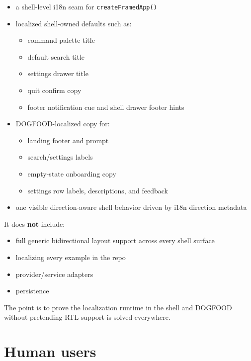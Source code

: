 \begin{itemize}
\tightlist
\item
  a shell-level i18n seam for \texttt{c\allowbreak{}r\allowbreak{}e\allowbreak{}a\allowbreak{}t\allowbreak{}e\allowbreak{}F\allowbreak{}r\allowbreak{}a\allowbreak{}m\allowbreak{}e\allowbreak{}d\allowbreak{}A\allowbreak{}p\allowbreak{}p\allowbreak{}(\allowbreak{})}
\item
  localized shell-owned defaults such as:

  \begin{itemize}
  \tightlist
  \item
    command palette title
  \item
    default search title
  \item
    settings drawer title
  \item
    quit confirm copy
  \item
    footer notification cue and shell drawer footer hints
  \end{itemize}
\item
  DOGFOOD-localized copy for:

  \begin{itemize}
  \tightlist
  \item
    landing footer and prompt
  \item
    search/settings labels
  \item
    empty-state onboarding copy
  \item
    settings row labels, descriptions, and feedback
  \end{itemize}
\item
  one visible direction-aware shell behavior driven by i18n direction metadata
\end{itemize}

It does \textbf{not} include:

\begin{itemize}
\tightlist
\item
  full generic bidirectional layout support across every shell surface
\item
  localizing every example in the repo
\item
  provider/service adapters
\item
  persistence
\end{itemize}

The point is to prove the localization runtime in the shell and DOGFOOD without pretending RTL support is solved everywhere.

\section{Human users}\label{record-194-human-users}

